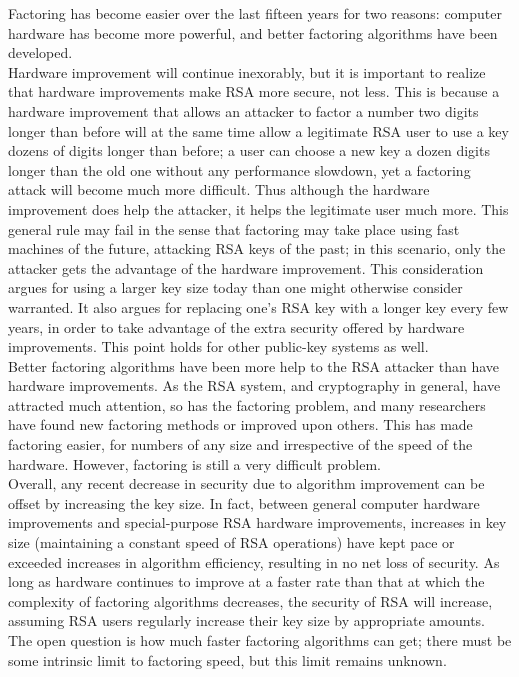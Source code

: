 Factoring has become easier over the last fifteen years for two
reasons: computer hardware has become more powerful, and better
factoring algorithms have been developed.\\

Hardware improvement will continue inexorably, but it is important to
realize that hardware improvements make RSA more secure, not less. This
is because a hardware improvement that allows an attacker to factor a
number two digits longer than before will at the same time allow a
legitimate RSA user to use a key dozens of digits longer than before; a
user can choose a new key a dozen digits longer than the old one
without any performance slowdown, yet a factoring attack will become
much more difficult. Thus although the hardware improvement does help
the attacker, it helps the legitimate user much more. This general rule
may fail in the sense that factoring may take place using fast machines
of the future, attacking RSA keys of the past; in this scenario, only
the attacker gets the advantage of the hardware improvement. This
consideration argues for using a larger key size today than one might
otherwise consider warranted. It also argues for replacing one's RSA
key with a longer key every few years, in order to take advantage of
the extra security offered by hardware improvements. This point holds
for other public-key systems as well.\\

Better factoring algorithms have been more help to the RSA attacker
than have hardware improvements. As the RSA system, and cryptography in
general, have attracted much attention, so has the factoring problem,
and many researchers have found new factoring methods or improved upon
others. This has made factoring easier, for numbers of any size and
irrespective of the speed of the hardware. However, factoring is still
a very difficult problem.\\

Overall, any recent decrease in security due to algorithm improvement
can be offset by increasing the key size. In fact, between general
computer hardware improvements and special-purpose RSA hardware
improvements, increases in key size (maintaining a constant speed of
RSA operations) have kept pace or exceeded increases in algorithm
efficiency, resulting in no net loss of security. As long as hardware
continues to improve at a faster rate than that at which the complexity
of factoring algorithms decreases, the security of RSA will increase,
assuming RSA users regularly increase their key size by appropriate
amounts. The open question is how much faster factoring algorithms can
get; there must be some intrinsic limit to factoring speed, but this
limit remains unknown.

